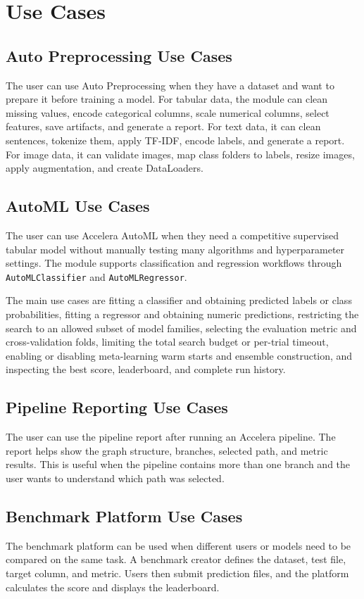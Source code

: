 \documentclass[12pt,a4paper]{report}
\begin{document}
\chapter{Use Cases}
\section{Auto Preprocessing Use Cases}
The user can use Auto Preprocessing when they have a dataset and want to
prepare it before training a model. For tabular data, the module can clean
missing values, encode categorical columns, scale numerical columns, select
features, save artifacts, and generate a report. For text data, it can clean
sentences, tokenize them, apply TF-IDF, encode labels, and generate a report.
For image data, it can validate images, map class folders to labels, resize
images, apply augmentation, and create DataLoaders.

\section{AutoML Use Cases}
The user can use Accelera AutoML when they need a competitive supervised
tabular model without manually testing many algorithms and hyperparameter
settings. The module supports classification and regression workflows through
\texttt{AutoMLClassifier} and \texttt{AutoMLRegressor}.

\noindent The main use cases are fitting a classifier and obtaining predicted
labels or class probabilities, fitting a regressor and obtaining numeric
predictions, restricting the search to an allowed subset of model families,
selecting the evaluation metric and cross-validation folds, limiting the total
search budget or per-trial timeout, enabling or disabling meta-learning warm
starts and ensemble construction, and inspecting the best score, leaderboard,
and complete run history.

\section{Pipeline Reporting Use Cases}
The user can use the pipeline report after running an Accelera pipeline. The
report helps show the graph structure, branches, selected path, and metric
results. This is useful when the pipeline contains more than one branch and the
user wants to understand which path was selected.

\section{Benchmark Platform Use Cases}
The benchmark platform can be used when different users or models need to be
compared on the same task. A benchmark creator defines the dataset, test file,
target column, and metric. Users then submit prediction files, and the platform
calculates the score and displays the leaderboard.
\end{document}

